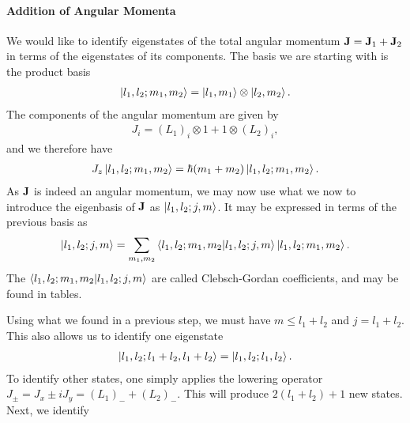 \paragraph{Addition of Angular Momenta}
We would like to identify eigenstates of the total angular momentum $\vb{J} = \vb{J}_{1} + \vb{J}_{2}$ in terms of the eigenstates of its components. The basis we are starting with is the product basis
\begin{align*}
	\ket{l_{1}, l_{2}; m_{1}, m_{2}} = \ket{l_{1}, m_{1}}\otimes\ket{l_{2}, m_{2}}.
\end{align*}
The components of the angular momentum are given by
\begin{align*}
	J_{i} = (L_{1})_{i}\otimes 1 + 1\otimes (L_{2})_{i},
\end{align*}
and we therefore have
\begin{align*}
	J_{z}\ket{l_{1}, l_{2}; m_{1}, m_{2}} = \hbar(m_{1} + m_{2})\ket{l_{1}, l_{2}; m_{1}, m_{2}}.
\end{align*}
As $\vb{J}$ is indeed an angular momentum, we may now use what we now to introduce the eigenbasis of $\vb{J}$ as $\ket{l_{1}, l_{2}; j, m}$. It may be expressed in terms of the previous basis as
\begin{align*}
	\ket{l_{1}, l_{2}; j, m} = \sum\limits_{m_{1}, m_{2}}\braket{l_{1}, l_{2}; m_{1}, m_{2}}{l_{1}, l_{2}; j, m}\ket{l_{1}, l_{2}; m_{1}, m_{2}}.
\end{align*}
The $\braket{l_{1}, l_{2}; m_{1}, m_{2}}{l_{1}, l_{2}; j, m}$ are called Clebsch-Gordan coefficients, and may be found in tables.

Using what we found in a previous step, we must have $m\leq l_{1} + l_{2}$ and $j = l_{1} + l_{2}$. This also allows us to identify one eigenstate
\begin{align*}
	\ket{l_{1}, l_{2}; l_{1} + l_{2}, l_{1} + l_{2}} = \ket{l_{1}, l_{2}; l_{1}, l_{2}}.
\end{align*}
To identify other states, one simply applies the lowering operator $J_{\pm} = J_{x}\pm iJ_{y} = (L_{1})_{-} + (L_{2})_{-}$. This will produce $2(l_{1} + l_{2}) + 1$ new states. Next, we identify